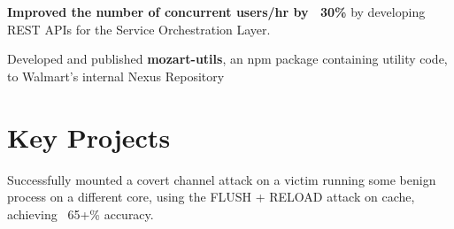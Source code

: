 \documentclass[a4paper]{deedy-resume-reversed}
\begin{document}
\begin{minipage}[t]{0.60\textwidth}
\begin{tightemize}
    \item \textbf{Improved the number of concurrent users/hr by ~30\%} by developing REST APIs for the Service Orchestration Layer.
    \item Developed and published \textbf{mozart-utils}, an npm package containing utility code, to Walmart's internal Nexus Repository
\end{tightemize}
\sectionsep



\section{Key Projects}
\descript{  }
\begin{tightemize}
        \item Successfully mounted a covert channel attack on a victim running some benign process on a different core, using the FLUSH + RELOAD attack on cache, achieving ~65+\% accuracy.
\end{tightemize}
\sectionsep


\end{minipage}
\end{document}
